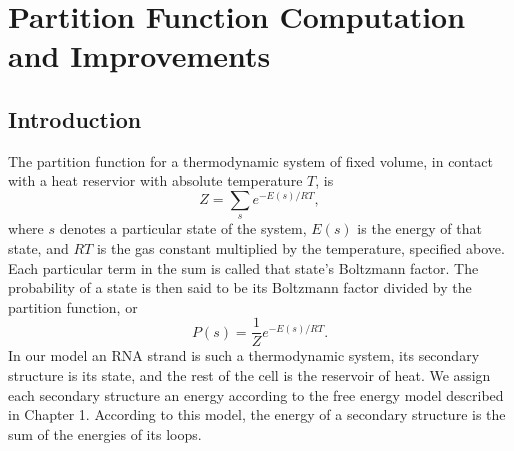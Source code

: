 \chapter{Partition Function Computation and Improvements}
\section{Introduction}

The partition function for a thermodynamic system of fixed volume, in
contact with a heat reservior with absolute temperature $T$, is
\begin{equation} Z = \sum_s e^{-E(s)/ RT }, \end{equation}
where $s$ denotes a particular state of the system, $E(s)$ is the
energy of that state, and $RT$ is the gas constant multiplied by the
temperature, specified above. Each particular term in the sum is
called that state's Boltzmann factor. The probability of a state is
then said to be its Boltzmann factor divided by the partition
function, or
\begin{equation} P(s) = \frac{1}{Z}e^{-E(s)/RT}.  \end{equation}
In our model an RNA strand is such a thermodynamic system, its
secondary structure is its state, and the rest of the cell is the
reservoir of heat. We assign each secondary structure an energy
according to the free energy model described in Chapter 1. According
to this model, the energy of a secondary structure is the sum of the
energies of its loops. 

